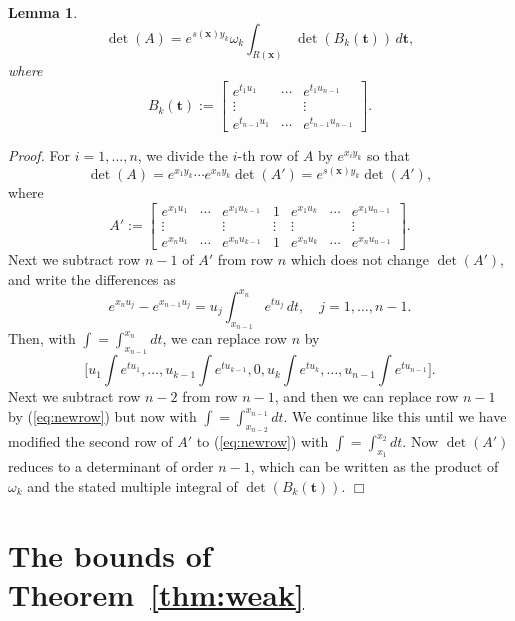 \documentclass[12pt]{article}
\def\bft{\mathbf{t}}
\def\bfx{\mathbf{x}}
\newtheorem{lemma}{Lemma}
\newenvironment{proof}{\begin{trivlist}\item[]{\emph{Proof.}}}
               {\hfill$\Box$\end{trivlist}}
\begin{document}
\begin{lemma}\label{lem:reductionupper}
$$
\det(A) = e^{s(\bfx)y_k} \omega_k
 \int_{R(\bfx)} \det(B_k(\bft)) \, d \bft,
$$
where
$$
B_k(\bft) := \left[
\begin{matrix}
e^{t_1 u_1} & \cdots & e^{t_1 u_{n-1}} \\
\vdots & & \vdots \\
e^{t_{n-1} u_1} & \cdots & e^{t_{n-1} u_{n-1}}
\end{matrix}
\right].
$$
\end{lemma}

\begin{proof}
For $i=1,\ldots,n$, we divide the $i$-th row of $A$ by $e^{x_i y_k}$
so that
$$
\det(A) = e^{x_1y_k} \cdots e^{x_ny_k} \det(A')
	= e^{s(\bfx)y_k} \det(A'),
$$
where
$$
A' :=
\left[
\begin{matrix}
e^{x_1 u_1} & \cdots & e^{x_1 u_{k-1}} & 1 &
e^{x_1 u_k} & \cdots & e^{x_1 u_{n-1}} \\
\vdots & & \vdots & \vdots & \vdots & & \vdots \\
e^{x_n u_1} & \cdots & e^{x_n u_{k-1}} & 1 &
e^{x_n u_k} & \cdots & e^{x_n u_{n-1}}
\end{matrix}
\right].
$$
Next we subtract row $n-1$ of $A'$ from row $n$ which does not
change $\det(A')$,
and write the differences as
$$ e^{x_n u_j} - e^{x_{n-1} u_j}
  = u_j \int_{x_{n-1}}^{x_n} e^{tu_j} \, dt, 
 \quad j=1,\ldots,n-1. $$
Then, with $\int = \int_{x_{n-1}}^{x_n} dt$, we can
replace row $n$ by
\begin{equation}\label{eq:newrow}
 \Big[u_1 \int e^{tu_1},\ldots,u_{k-1} \int e^{tu_{k-1}},0, 
  u_k \int e^{tu_k},\ldots,u_{n-1}\int e^{tu_{n-1}}\Big].
\end{equation}
Next we subtract row $n-2$ from row $n-1$,
and then we can replace row $n-1$ by (\ref{eq:newrow}) but now
with $\int = \int_{x_{n-2}}^{x_{n-1}} dt$.
We continue like this until we have modified the second row of $A'$ to
(\ref{eq:newrow}) with $\int = \int_{x_1}^{x_2} dt$.
Now $\det(A')$ reduces to a
determinant of order $n-1$, which can be written as the
product of $\omega_k$ and the stated multiple integral
of $\det(B_k(\bft))$.
\end{proof}

\section{The bounds of Theorem~\ref{thm:weak}}
\end{document}
